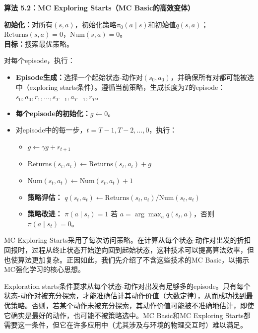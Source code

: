 \documentclass[UTF8]{article}
\begin{document}
\begin{definitionbox}
    \textbf{算法 5.2：MC Exploring Starts（MC Basic的高效变体）}

    \textbf{初始化：}对所有$(s,a)$，初始化策略$\pi_0(a \mid s)$和初始值$q(s,a)$；\\
    $\text{Returns}(s,a) = 0$，$\text{Num}(s,a) = 0$。\\
    \textbf{目标：}搜索最优策略。

    对每个episode，执行：
    \begin{itemize}
        \item \textbf{Episode生成：}选择一个起始状态-动作对$(s_0, a_0)$，并确保所有对都可能被选中（exploring starts条件）。遵循当前策略，生成长度为$T$的episode：$s_0, a_0, r_1, \ldots, s_{T-1}, a_{T-1}, r_T$。
        \item \textbf{每个episode的初始化：}$g \leftarrow 0$。
        \item 对episode中的每一步，$t = T-1, T-2, \ldots, 0$，执行：
        \begin{itemize}
            \item $g \leftarrow \gamma g + r_{t+1}$
            \item $\text{Returns}(s_t, a_t) \leftarrow \text{Returns}(s_t, a_t) + g$
            \item $\text{Num}(s_t, a_t) \leftarrow \text{Num}(s_t, a_t) + 1$
            \item \textbf{策略评估：}
            $q(s_t, a_t) \leftarrow \text{Returns}(s_t, a_t) / \text{Num}(s_t, a_t)$
            \item \textbf{策略改进：}
            $\pi(a \mid s_t) = 1$ 若 $a = \arg\max_a q(s_t, a)$，否则 $\pi(a \mid s_t) = 0$。
        \end{itemize}
    \end{itemize}
\end{definitionbox}

MC Exploring Starts采用了每次访问策略。在计算从每个状态-动作对出发的折扣回报时，过程从终止状态开始逆向回到起始状态，这种技术可以提高算法效率，但也使算法更加复杂。正因如此，我们先介绍了不含这些技术的MC Basic，以揭示MC强化学习的核心思想。

Exploration starts条件要求从每个状态-动作对出发有足够多的episode。只有每个状态-动作对被充分探索，才能准确估计其动作价值（大数定律），从而成功找到最优策略。否则，若某个动作未被充分探索，其动作价值可能被不准确地估计，即使它确实是最好的动作，也可能不被策略选中。MC Basic和MC Exploring Starts都需要这一条件，但它在许多应用中（尤其涉及与环境的物理交互时）难以满足。
\end{document}
